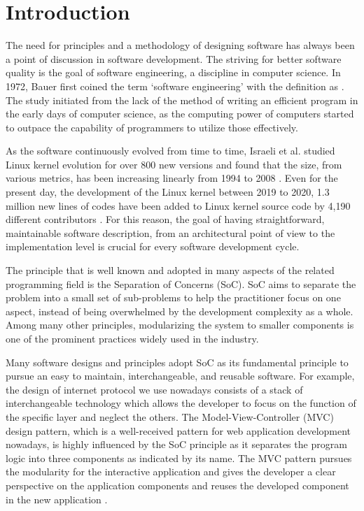 \chapter*{Introduction}
The need for principles and a methodology of designing software has always been a point of discussion in software development. The striving for better software quality is the goal of software engineering, a discipline in computer science. In 1972, Bauer \cite{DBLP:conf/ifip/Bauer71} first coined the term ‘software engineering’ with the definition as . The study initiated from the lack of the method of writing an efficient program in the early days of computer science, as the computing power of computers started to outpace the capability of programmers to utilize those effectively.

As the software continuously evolved from time to time, Israeli et al. studied Linux kernel evolution for over 800 new versions and found that the size, from various metrics, has been increasing linearly from 1994 to 2008 \cite{10.1016/j.jss.2009.09.042}. Even for the present day, the development of the Linux kernel between 2019 to 2020, 1.3 million new lines of codes have been added to Linux kernel source code by 4,190 different contributors \cite{anderson2020}. For this reason, the goal of having straightforward, maintainable software description, from an architectural point of view to the implementation level is crucial for every software development cycle.

The principle that is well known and adopted in many aspects of the related programming field is the Separation of Concerns (SoC). SoC aims to separate the problem into a small set of sub-problems to help the practitioner focus on one aspect, instead of being overwhelmed by the development complexity as a whole. Among many other principles, modularizing the system to smaller components is one of the prominent practices widely used in the industry.

Many software designs and principles adopt SoC as its fundamental principle to pursue an easy to maintain, interchangeable, and reusable software. For example, the design of internet protocol we use nowadays consists of a stack of interchangeable technology which allows the developer to focus on the function of the specific layer and neglect the others\cite{stack-1994}. The Model-View-Controller (MVC) design pattern, which is a well-received pattern for web application development nowadays, is highly influenced by the SoC principle as it separates the program logic into three components as indicated by its name. The MVC pattern pursues the modularity for the interactive application and gives the developer a clear perspective on the application components and reuses the developed component in the new application \cite{krasner88joop}.

